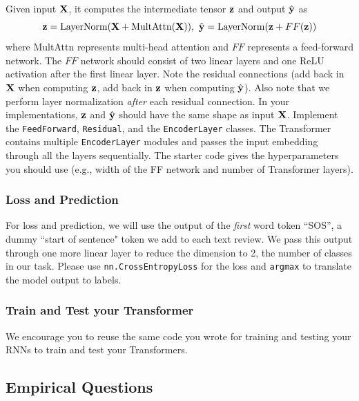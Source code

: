 Given input $\mathbf{X}$, it computes the intermediate tensor $\mathbf{z}$ and output $\hat{\mathbf{y}}$ as
\[
\mathbf{z} = \textrm{LayerNorm}(\mathbf{X} + \textrm{MultAttn}(\mathbf{X})), \ \hat{\mathbf{y}} = \textrm{LayerNorm}(\mathbf{z} + FF(\mathbf{z}))
\]
where MultAttn represents multi-head attention and $FF$ represents a feed-forward network. The $FF$ network should consist of two linear layers and one ReLU activation after the first linear layer. Note the residual connections (add back in $\mathbf{X}$ when computing $\mathbf{z}$, add back in $\mathbf{z}$ when computing $\hat{\mathbf{y}}$). Also note that we perform layer normalization \emph{after} each residual connection. In your implementations, $\mathbf{z}$ and $\hat{\mathbf{y}}$ should have the same shape as input $\mathbf{X}$. Implement the \texttt{FeedForward}, \texttt{Residual}, and the \texttt{EncoderLayer} classes. The Transformer contains multiple \texttt{EncoderLayer} modules and passes the input embedding through all the layers sequentially. The starter code gives the hyperparameters you should use (e.g., width of the FF network and number of Transformer layers).

\subsubsection{Loss and Prediction}

For loss and prediction, we will use the output of the \emph{first} word token ``SOS'', a dummy ``start of sentence" token we add to each text review. We pass this output through one more linear layer to reduce the dimension to 2, the number of classes in our task. Please use \texttt{nn.CrossEntropyLoss} for the loss and \texttt{argmax} to translate the model output to labels.

\subsubsection{Train and Test your Transformer} 

We encourage you to reuse the same code you wrote for training and testing your RNNs to train and test your Transformers. 



\newpage

\subsection{Empirical Questions}

